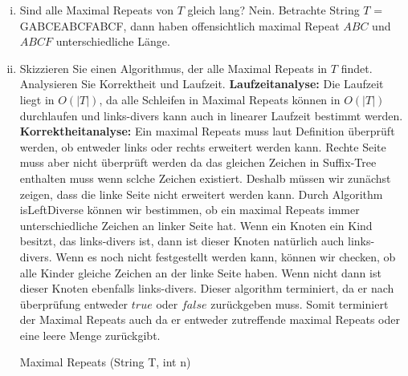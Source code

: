 \documentclass{article}
\newtheorem{theorem}{Theorem}
\begin{document}
\begin{flushleft}
\begin{enumerate}[(a)]
\begin{enumerate}[(i)]
        \begin{theorem}
            Es kann höchstens $n$ maximal Repeats in einem String $T$ der Länge $n$ geben.
        \end{theorem}
        Ein Sffuix-Tree kann maximal $n$ innere Knoten besitzen damit ergibt sich höchstens $n$ maximal Repeats für ein Suffix-Tree.
        \item Sind alle Maximal Repeats von $T$ gleich lang?
        \newline
        Nein. Betrachte String $T$ = GABCEABCFABCF, dann haben offensichtlich maximal Repeat $ABC$ und $ABCF$ unterschiedliche Länge. 
        \item Skizzieren Sie einen Algorithmus, der alle Maximal Repeats in $T$ findet. Analysieren Sie Korrektheit und Laufzeit.
        \newline
        \textbf{Laufzeitanalyse: }
        \newline
        Die Laufzeit liegt in $O(|T|)$, da alle Schleifen in Maximal Repeats können in $O(|T|)$ durchlaufen und links-divers
        kann auch in linearer Laufzeit bestimmt werden.
        \newline
        \textbf{Korrektheitanalyse: }
        \newline
        Ein maximal Repeats muss laut Definition überprüft werden, ob entweder links oder rechts erweitert werden kann.
        Rechte Seite muss aber nicht überprüft werden da das gleichen Zeichen in Suffix-Tree enthalten muss wenn sclche Zeichen existiert. 
        Deshalb müssen wir zunächst zeigen, dass die linke Seite nicht erweitert werden kann. Durch Algorithm isLeftDiverse können wir
        bestimmen, ob ein maximal Repeats immer unterschiedliche Zeichen an linker Seite hat. Wenn ein Knoten ein Kind besitzt, das links-divers ist,
        dann ist dieser Knoten natürlich auch links-divers. Wenn es noch nicht festgestellt werden kann, können wir checken, ob alle Kinder gleiche Zeichen
        an der linke Seite haben. Wenn nicht dann ist dieser Knoten ebenfalls links-divers. Dieser algorithm terminiert, da er nach überprüfung entweder 
        $true$ oder $false$ zurückgeben muss. Somit terminiert der Maximal Repeats auch da er entweder zutreffende maximal Repeats oder 
        eine leere Menge zurückgibt.
        \begin{algorithm}
            \NoCaptionOfAlgo
            \SetSideCommentLeft
            \caption{Maximal Repeats (String T, int n)}
\end{algorithm}
\end{enumerate}
\end{enumerate}
\end{flushleft}
\end{document}
